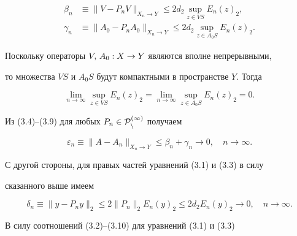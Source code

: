\begin{align}


\beta_n&\equiv \|V-P_nV\|_{{X_n\rightarrow Y}}


\leq 2 d_2\sup_{z\in VS} E_n(z)_2 , \\


%


\gamma_n&\equiv \|A_0-P_nA_0\|_{{X_n\rightarrow Y}}


\leq 2 d_2\sup_{z\in A_0S} E_n(z)_2 .


\end{align}


Поскольку операторы $V,\,A_0 : X \to Y$ являются вполне непрерывными,


то множества $VS$ и $A_0S$ будут компактными в пространстве $Y$. Тогда


\begin{equation}


\lim_{n\rightarrow \infty}\sup_{z\in VS} E_n(z)_2 =\lim_{n\rightarrow


\infty}\sup_{z\in A_0S} E_n(z)_2 =0.


\end{equation}


Из (3.4)--(3.9) для любых $P_n\in \cal P_n^{(1)}$ получаем


\begin{equation}


\varepsilon_n\equiv \|A-A_n\|_{{X_n\rightarrow Y}}


\leq \beta_n+\gamma_n\rightarrow 0,\quad n\rightarrow


\infty .


\end{equation}





С другой стороны, для правых частей уравнений (3.1) и (3.3) в силу


сказанного выше имеем


\begin{equation}


\delta_n\equiv \|y-P_ny\|_2 \leq 2 \|P_n\|_2 E_n(y)_2 \leq


2 d_2E_n(y)_2 \rightarrow 0,\quad n\rightarrow \infty.


\end{equation}





В силу соотношений (3.2)--(3.10) для уравнений (3.1) и (3.3)


